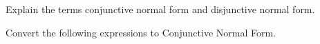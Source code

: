 


\begin{questions}


\question
Explain the terms conjunctive normal form and disjunctive normal form.
\begin{solution}

\end{solution}


\question
Convert the following expressions to Conjunctive Normal Form.
\begin{solution}
\end{solution}
\end{questions}
